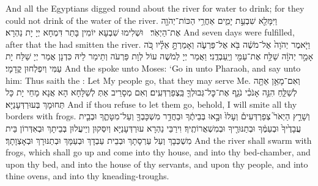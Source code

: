 {And all the Egyptians digged round about the river for water to drink; for they could not drink of the water of the river.}{}
{וַיִּמָּלֵ֖א שִׁבְעַ֣ת יָמִ֑ים אַחֲרֵ֥י הַכּוֹת־יְהֹוָ֖ה אֶת־הַיְאֹֽר׃ \petucha 
{}}
{וּשְׁלִימוּ שִׁבְעָא יוֹמִין בָּתַר דִּמְחָא יְיָ יָת נַהְרָא׃}
{And seven days were fulfilled, after that the \lord\space had smitten the river.}{}
{וַיֹּ֤אמֶר יְהֹוָה֙ אֶל־מֹשֶׁ֔ה בֹּ֖א אֶל־פַּרְעֹ֑ה וְאָמַרְתָּ֣ אֵלָ֗יו כֹּ֚ה אָמַ֣ר יְהֹוָ֔ה שַׁלַּ֥ח אֶת־עַמִּ֖י וְיַֽעַבְדֻֽנִי׃}
{וַאֲמַר יְיָ לְמֹשֶׁה עוֹל לְוָת פַּרְעֹה וְתֵימַר לֵיהּ כִּדְנָן אֲמַר יְיָ שַׁלַּח יָת עַמִּי וְיִפְלְחוּן קֳדָמָי׃}
{And the \lord\space spoke unto Moses: ‘Go in unto Pharaoh, and say unto him: Thus saith the \lord: Let My people go, that they may serve Me.}{}
{וְאִם־מָאֵ֥ן אַתָּ֖ה לְשַׁלֵּ֑חַ הִנֵּ֣ה אָנֹכִ֗י נֹגֵ֛ף אֶת־כׇּל־גְּבוּלְךָ֖ בַּֽצְפַרְדְּעִֽים׃
}
{וְאִם מְסָרֵיב אַתְּ לְשַׁלָּחָא הָא אֲנָא מָחֵי יָת כָּל תְּחוּמָךְ בְּעוּרְדְּעָנַיָּא׃}
{And if thou refuse to let them go, behold, I will smite all thy borders with frogs.}{}
{וְשָׁרַ֣ץ הַיְאֹר֮ צְפַרְדְּעִים֒ וְעָלוּ֙ וּבָ֣אוּ בְּבֵיתֶ֔ךָ וּבַחֲדַ֥ר מִשְׁכָּבְךָ֖ וְעַל־מִטָּתֶ֑ךָ וּבְבֵ֤ית עֲבָדֶ֙יךָ֙ וּבְעַמֶּ֔ךָ וּבְתַנּוּרֶ֖יךָ וּבְמִשְׁאֲרוֹתֶֽיךָ׃
}
{וִירַבֵּי נַהְרָא עוּרְדְּעָנַיָּא וְיִסְּקוּן וְיֵיעֲלוּן בְּבֵיתָךְ וּבְאִדְּרוֹן בֵּית מִשְׁכְּבָךְ וְעַל עַרְסָתָךְ וּבְבֵית עַבְדָךְ וּבְעַמָּךְ וּבְתַנּוּרָךְ וּבְאָצְוָתָךְ׃}
{And the river shall swarm with frogs, which shall go up and come into thy house, and into thy bed-chamber, and upon thy bed, and into the house of thy servants, and upon thy people, and into thine ovens, and into thy kneading-troughs.}{}
